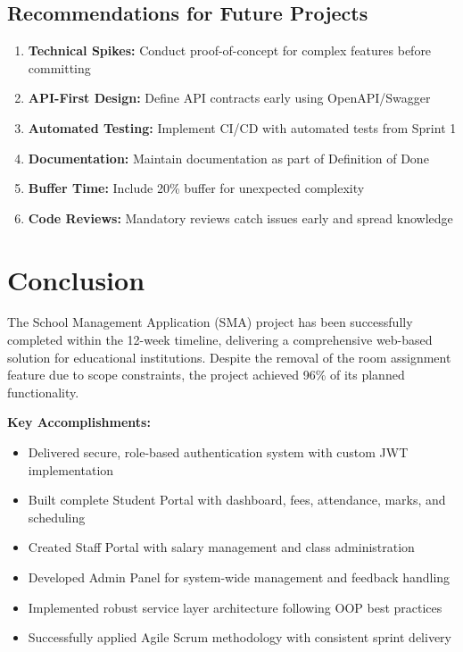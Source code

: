 \documentclass[12pt,a4paper]{article}
\begin{document}
\subsection{Recommendations for Future Projects}

\begin{enumerate}[noitemsep]
    \item \textbf{Technical Spikes:} Conduct proof-of-concept for complex features before committing
    \item \textbf{API-First Design:} Define API contracts early using OpenAPI/Swagger
    \item \textbf{Automated Testing:} Implement CI/CD with automated tests from Sprint 1
    \item \textbf{Documentation:} Maintain documentation as part of Definition of Done
    \item \textbf{Buffer Time:} Include 20\% buffer for unexpected complexity
    \item \textbf{Code Reviews:} Mandatory reviews catch issues early and spread knowledge
\end{enumerate}

\section{Conclusion}

The School Management Application (SMA) project has been successfully completed within the 12-week timeline, delivering a comprehensive web-based solution for educational institutions. Despite the removal of the room assignment feature due to scope constraints, the project achieved 96\% of its planned functionality.

\textbf{Key Accomplishments:}
\begin{itemize}[noitemsep]
    \item Delivered secure, role-based authentication system with custom JWT implementation
    \item Built complete Student Portal with dashboard, fees, attendance, marks, and scheduling
    \item Created Staff Portal with salary management and class administration
    \item Developed Admin Panel for system-wide management and feedback handling
    \item Implemented robust service layer architecture following OOP best practices
    \item Successfully applied Agile Scrum methodology with consistent sprint delivery
\end{itemize}
\end{document}
